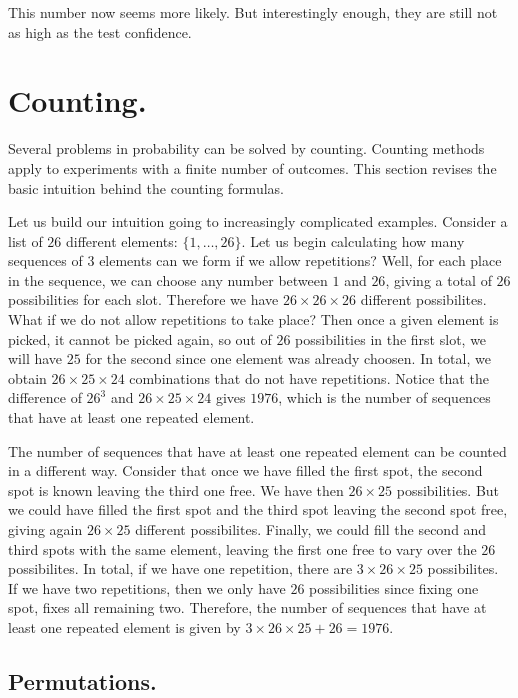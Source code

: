 \documentclass[12pt]{article}
\begin{document}
This number now seems more likely. But interestingly enough, they are still not as high as the 
test confidence.

\section{Counting.}

Several problems in probability can be solved by counting.
Counting methods apply to experiments with a finite number of outcomes.
This section revises the basic intuition behind the counting formulas.

Let us build our intuition going to increasingly complicated examples.
Consider a list of $26$ different elements: $\{ 1, \ldots, 26 \}$.
Let us begin calculating how many sequences of 3 elements can we form if we allow repetitions?
Well, for each place in the sequence, we can choose any number between $1$ and $26$, giving a total
of $26$ possibilities for each slot. Therefore we have $26 \times 26 \times 26$ different possibilites.
What if we do not allow repetitions to take place? Then once a given element is picked, it cannot be picked
again, so out of $26$ possibilities in the first slot, we will have $25$ for the second since one element was 
already choosen. In total, we obtain $26 \times 25 \times 24$ combinations that do not have repetitions.
Notice that the difference of $26^{3}$ and $26 \times 25 \times 24$ gives $1976$, which is the number of sequences
that have at least one repeated element.

The number of sequences that have at least one repeated element can be counted in a different way.
Consider that once we have filled the first spot, the second spot is known leaving the third one free. We have then $26 \times 25$ possibilities.
But we could have filled the first spot and the third spot leaving the second spot free, giving again $26 \times 25$ different possibilites.
Finally, we could fill the second and third spots with the same element, leaving the first one free to vary over the $26$ possibilites.
In total, if we have one repetition, there are $3 \times 26 \times 25$ possibilites.
If we have two repetitions, then we only have $26$ possibilities since fixing one spot, fixes all remaining two.
Therefore, the number of sequences that have at least one repeated element is given by $3 \times 26 \times 25 + 26 = 1976$.

\subsection{Permutations.}
\end{document}
